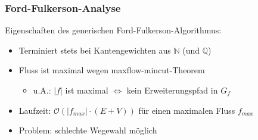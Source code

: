 \documentclass{beamer}
\newcommand{\ff}{Ford-Fulkerson}
\begin{document}
\begin{frame}
\frametitle{\ff-Analyse}
Eigenschaften des generischen \ff-Algorithmus:
\begin{itemize}
\item<1-> Terminiert stets bei Kantengewichten aus $\mathbb{N}$ (und $\mathbb{Q}$)
\item<2-> Fluss ist maximal wegen \alert{maxflow-mincut-Theorem} 
\begin{itemize}
\item u.A.: $\lvert f\rvert$ ist maximal $\Leftrightarrow$ kein Erweiterungspfad in $G_{f}$
\end{itemize}
\item<3-> Laufzeit: $\mathcal{O}(\lvert f_{max}\rvert \cdot (E + V))$ für einen maximalen Fluss $f_{max}$
\item<4-> Problem: schlechte Wegewahl möglich
\end{itemize}
\end{frame}
\end{document}
